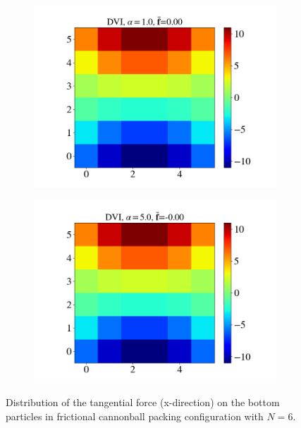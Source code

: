 \begin{itemize}
\begin{figure}[H]
\begin{subfigure}{0.32\columnwidth}
			\includegraphics[width=1.0\textwidth]{images/CD/Example7/5/T1_6_DVI_1.0.png}
		\end{subfigure}
		\begin{subfigure}{0.32\columnwidth}	
			\centering
			\includegraphics[width=1.0\textwidth]{images/CD/Example7/5/T1_6_DVI_5.0.png}
		\end{subfigure}
		\caption{Distribution of the tangential force (x-direction) on the bottom particles in frictional cannonball packing configuration with $N=6$.}\label{fig:cbp_fp_T1=6}
	\end{figure}
	

\end{itemize}

